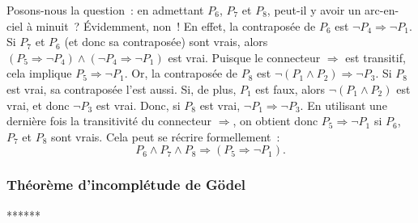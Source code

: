 Posons-nous la question : en admettant $P_6$, $P_7$ et $P_8$, peut-il y avoir un arc-en-ciel à minuit ? 
Évidemment, non ! 
En effet, la contraposée de $P_6$ est $\neg  P_4 \Rightarrow \neg P_1$. 
Si $P_7$ et $P_6$ (et donc sa contraposée) sont vrais, alors $(P_5 \Rightarrow \neg P_4) \wedge (\neg  P_4 \Rightarrow \neg P_1)$ est vrai. 
Puisque le connecteur $\Rightarrow$ est transitif, cela implique $P_5 \Rightarrow \neg P_1$. 
Or, la contraposée de $P_8$ est $\neg (P_1 \wedge P_2) \Rightarrow \neg P_3$. 
Si $P_8$ est vrai, sa contraposée l'est aussi. 
Si, de plus, $P_1$ est faux, alors $\neg (P_1 \wedge P_2)$ est vrai, et donc $\neg P_3$ est vrai. 
Donc, si $P_8$ est vrai, $\neg P_1 \Rightarrow \neg P_3$. 
En utilisant une dernière fois la transitivité du connecteur $\Rightarrow$, on obtient donc $P_5 \Rightarrow \neg P_1$ si $P_6$, $P_7$ et $P_8$ sont vrais. 
Cela peut se récrire formellement : 
\begin{equation*}
    P_6 \wedge P_7 \wedge P_8 \Rightarrow (P_5 \Rightarrow \neg P_1). 
\end{equation*}

\subsubsection{Théorème d'incomplétude de Gödel}

******


